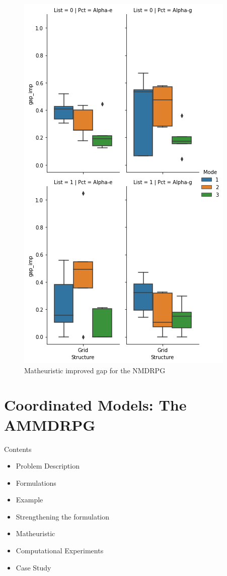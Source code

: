 \documentclass[slidestop,usepdftitle=false,10pt]{beamer}
\begin{document}
	\begin{frame}
		\small
	    \begin{figure}
        \centering
        \includegraphics[width=0.35\linewidth]{improved_gap_ND.png}
        \caption{Matheuristic improved gap for the NMDRPG}
        \label{fig:4}
        \end{figure}
	\end{frame}
	

	\section{Coordinated Models: The AMMDRPG}
	\begin{frame}{Contents}
	    \begin{itemize}
		    \item Problem Description
		    \item Formulations
		    \item Example
		    \item Strengthening the formulation
		    \item Matheuristic
		    \item Computational Experiments
		    \item Case Study
		\end{itemize}
	\end{frame}
	
\end{document}
